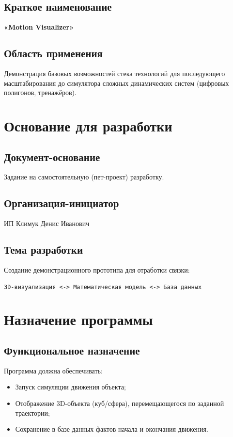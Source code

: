 \documentclass[a4paper,14pt]{extarticle}
\begin{document}
\subsection{Краткое наименование}
\textbf{«Motion Visualizer»}

\subsection{Область применения}
Демонстрация базовых возможностей стека технологий для последующего масштабирования до симулятора сложных динамических систем (цифровых полигонов, тренажёров).

\section{Основание для разработки}

\subsection{Документ-основание}
Задание на самостоятельную (пет-проект) разработку.

\subsection{Организация-инициатор}
ИП Климук Денис Иванович

\subsection{Тема разработки}
Создание демонстрационного прототипа для отработки связки:

\begin{center}
\texttt{3D-визуализация <-> Математическая модель <-> База данных}
\end{center}

\section{Назначение программы}

\subsection{Функциональное назначение}
Программа должна обеспечивать:
\begin{itemize}
    \item Запуск симуляции движения объекта;
    \item Отображение 3D-объекта (куб/сфера), перемещающегося по заданной траектории;
    \item Сохранение в базе данных фактов начала и окончания движения.
\end{itemize}
\end{document}
